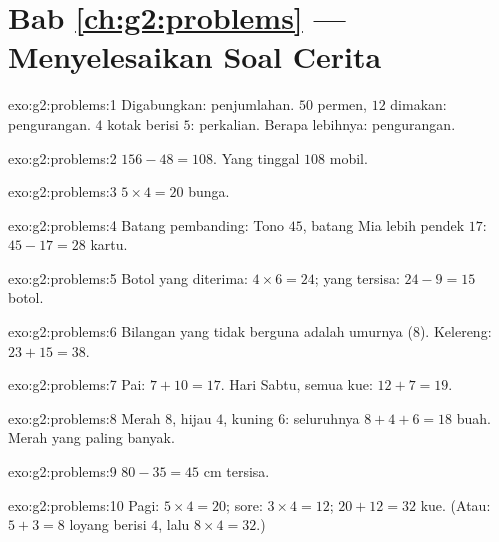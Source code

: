 \section*{Bab \ref{ch:g2:problems} --- Menyelesaikan Soal Cerita}

\begin{solution}{exo:g2:problems:1}
Digabungkan: penjumlahan. $50$ permen, $12$ dimakan: pengurangan.
$4$ kotak berisi $5$: perkalian. Berapa lebihnya: pengurangan.
\end{solution}

\begin{solution}{exo:g2:problems:2}
$156 - 48 = 108$. Yang tinggal $108$ mobil.
\end{solution}

\begin{solution}{exo:g2:problems:3}
$5 \times 4 = 20$ bunga.
\end{solution}

\begin{solution}{exo:g2:problems:4}
Batang pembanding: Tono $45$, batang Mia lebih pendek $17$:
$45 - 17 = 28$ kartu.
\end{solution}

\begin{solution}{exo:g2:problems:5}
Botol yang diterima: $4 \times 6 = 24$; yang tersisa:
$24 - 9 = 15$ botol.
\end{solution}

\begin{solution}{exo:g2:problems:6}
Bilangan yang tidak berguna adalah umurnya ($8$). Kelereng:
$23 + 15 = 38$.
\end{solution}

\begin{solution}{exo:g2:problems:7}
Pai: $7 + 10 = 17$. Hari Sabtu, semua kue:
$12 + 7 = 19$.
\end{solution}

\begin{solution}{exo:g2:problems:8}
Merah $8$, hijau $4$, kuning $6$: seluruhnya $8 + 4 + 6 = 18$ buah.
Merah yang paling banyak.
\end{solution}

\begin{solution}{exo:g2:problems:9}
$80 - 35 = 45$ cm tersisa.
\end{solution}

\begin{solution}{exo:g2:problems:10}
Pagi: $5 \times 4 = 20$; sore: $3 \times 4 = 12$; 
$20 + 12 = 32$ kue. (Atau: $5 + 3 = 8$ loyang berisi $4$, lalu
$8 \times 4 = 32$.)

\end{solution}
